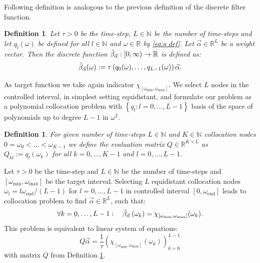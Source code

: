 \documentclass[a4paper,11pt,bibliography=totoc,listof=totoc,headinclude=true,cleardoublepage=empty,oneside]{scrbook}
\newtheorem{definition}[theorem]{Definition}
\newcommand{\R}{\mathbb{R}}
\newcommand{\N}{\mathbb{N}}
\newcommand{\dffv}{\Tilde{\beta}_{\Vec{\alpha}}}
\newcommand{\e}{\mathrm{end}}
\begin{document}
Following definition is analogous to the previous definition of the discrete filter function.

\begin{definition}
    Let $\tau > 0$ be the time-step, $L\in \N$ be the number of time-steps and let $q_l(\omega)$ be defined for all $l \in \N$ and $\omega \in \R$ by \eqref{eq:q def}. Let $\Vec{\alpha}\in\R^L$ be a weight vector. Then the discrete function $\dffv: [0, \infty) \rightarrow \R$ is defined as:
    \begin{equation*}\label{eq:dffv}
        \dffv (\omega) := \tau \left(q_0(\omega), \dots, q_{L-1}(\omega)\right) \Vec{\alpha}. 
    \end{equation*}
\end{definition}

As target function we take again indicator $\chi_{\left[\omega_{\min}, \omega_{\max}\right]}$. We select $L$ nodes in the controlled interval, in simplest setting equidistant, and formulate our problem as a polynomial collocation problem with $\left\{q_l : l=0, \dots, L-1\right\}$ basis of the space of polynomials up to degree $L-1$ in $\omega^2$.
\begin{definition}\label{def:evaluation matrix}
    For given number of time-steps $L\in \N$ and $K\in \N$ collocation nodes $ 0 = \omega_0 < \dots < \omega_{K-1}$ we define the evaluation matrix $Q \in \R^{K\times L}$ as $Q_{kl} := q_l\left(\omega_k\right)$ for all $k=0, \dots, K-1$ and $l=0, \dots, L-1$. 
\end{definition}

Let $\tau>0$ be the time-step and $L\in \N$ be the number of time-steps and $\left[\omega_{\min}, \omega_{\max}\right]$ be the target interval. Selecting $L$ equidistant collocation nodes $\omega_l = l\omega_\e/ (L-1)$ for $l=0, \dots, L-1$ in controlled interval $\left[0, \omega_{\e}\right]$ leads to collocation problem to find $\Vec{\alpha} \in \R^L$, such that:
\begin{equation*}
    \forall k = 0, \dots, L-1: \quad \dffv\left(\omega_k\right) = \chi_{\left[\omega_{\min}, \omega_{\max}\right]}(\omega_k).
\end{equation*}
This problem is equivalent to linear system of equations:
\begin{equation}\label{eq:alpha eq coll}
     Q \Vec{\alpha} = \frac{1}{\tau} \left(\chi_{\left[\omega_{\min}, \omega_{\max}\right]}(\omega_k) \right)_{k=0}^{L-1}
\end{equation}
with matrix $Q$ from Definition \ref{def:evaluation matrix}.
\end{document}

